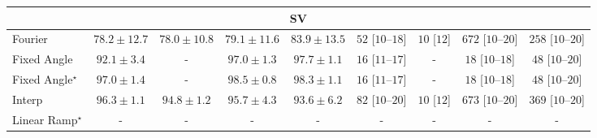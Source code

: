 \begin{tabular}{l|cccc|cccc|}
\cline{1-9}
\multicolumn{9}{c}{\rule{0pt}{8pt}SV} \\
\midrule
Fourier & {\cellcolor[HTML]{FEF6FA}} \color[HTML]{000000} $78.2\pm 12.7$ & {\cellcolor[HTML]{FFF7FB}} \color[HTML]{000000} $78.0\pm 10.8$ & {\cellcolor[HTML]{F7F0F7}} \color[HTML]{000000} $79.1\pm 11.6$ & {\cellcolor[HTML]{C4CBE3}} \color[HTML]{000000} $83.9\pm 13.5$ & {\cellcolor[HTML]{FEEBE8}} \color[HTML]{000000} $52$ [$10$--$18$] & {\cellcolor[HTML]{FFF7F3}} \color[HTML]{000000} $10$ [$12$] & {\cellcolor[HTML]{49006A}} \color[HTML]{F1F1F1} $672$ [$10$--$20$] & {\cellcolor[HTML]{FAA0B5}} \color[HTML]{000000} $258$ [$10$--$20$] \\
Fixed Angle & {\cellcolor[HTML]{1C7FB8}} \color[HTML]{F1F1F1} $92.1\pm 3.4$ & {\cellcolor[HTML]{000000}} \color[HTML]{F1F1F1} {\cellcolor{white}} \color{black} - & {\cellcolor[HTML]{034B76}} \color[HTML]{F1F1F1} $97.0\pm 1.3$ & {\cellcolor[HTML]{034267}} \color[HTML]{F1F1F1} $97.7\pm 1.1$ & {\cellcolor[HTML]{FFF6F2}} \color[HTML]{000000} $16$ [$11$--$17$] & {\cellcolor[HTML]{000000}} \color[HTML]{F1F1F1} {\cellcolor{white}} \color{black} - & {\cellcolor[HTML]{FFF5F1}} \color[HTML]{000000} $18$ [$10$--$18$] & {\cellcolor[HTML]{FEEDE9}} \color[HTML]{000000} $48$ [$10$--$20$] \\
Fixed Angle$^\star$ & {\cellcolor[HTML]{034B76}} \color[HTML]{F1F1F1} $97.0\pm 1.4$ & {\cellcolor[HTML]{000000}} \color[HTML]{F1F1F1} {\cellcolor{white}} \color{black} - & {\cellcolor[HTML]{023858}} \color[HTML]{F1F1F1} $98.5\pm 0.8$ & {\cellcolor[HTML]{023A5B}} \color[HTML]{F1F1F1} $98.3\pm 1.1$ & {\cellcolor[HTML]{FFF6F2}} \color[HTML]{000000} $16$ [$11$--$17$] & {\cellcolor[HTML]{000000}} \color[HTML]{F1F1F1} {\cellcolor{white}} \color{black} - & {\cellcolor[HTML]{FFF5F1}} \color[HTML]{000000} $18$ [$10$--$18$] & {\cellcolor[HTML]{FEEDE9}} \color[HTML]{000000} $48$ [$10$--$20$] \\
Interp & {\cellcolor[HTML]{045585}} \color[HTML]{F1F1F1} $96.3\pm 1.1$ & {\cellcolor[HTML]{04649D}} \color[HTML]{F1F1F1} $94.8\pm 1.2$ & {\cellcolor[HTML]{045B8F}} \color[HTML]{F1F1F1} $95.7\pm 4.3$ & {\cellcolor[HTML]{056EAD}} \color[HTML]{F1F1F1} $93.6\pm 6.2$ & {\cellcolor[HTML]{FDE4E0}} \color[HTML]{000000} $82$ [$10$--$20$] & {\cellcolor[HTML]{FFF7F3}} \color[HTML]{000000} $10$ [$12$] & {\cellcolor[HTML]{49006A}} \color[HTML]{F1F1F1} $673$ [$10$--$20$] & {\cellcolor[HTML]{EE579E}} \color[HTML]{F1F1F1} $369$ [$10$--$20$] \\
Linear Ramp$^\star$ & {\cellcolor[HTML]{000000}} \color[HTML]{F1F1F1} {\cellcolor{white}} \color{black} - & {\cellcolor[HTML]{000000}} \color[HTML]{F1F1F1} {\cellcolor{white}} \color{black} - & {\cellcolor[HTML]{000000}} \color[HTML]{F1F1F1} {\cellcolor{white}} \color{black} - & {\cellcolor[HTML]{000000}} \color[HTML]{F1F1F1} {\cellcolor{white}} \color{black} - & {\cellcolor[HTML]{000000}} \color[HTML]{F1F1F1} {\cellcolor{white}} \color{black} - & {\cellcolor[HTML]{000000}} \color[HTML]{F1F1F1} {\cellcolor{white}} \color{black} - & {\cellcolor[HTML]{000000}} \color[HTML]{F1F1F1} {\cellcolor{white}} \color{black} - & {\cellcolor[HTML]{000000}} \color[HTML]{F1F1F1} {\cellcolor{white}} \color{black} - \\

\end{tabular}
